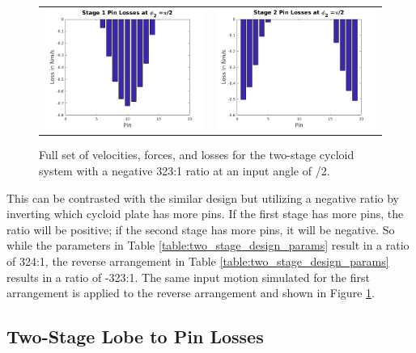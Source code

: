 \begin{figure}[!t]
\begin{tabular}{cc}
	   \hline
	   
	   \includegraphics[width=0.50\columnwidth]{fig/double_1_neg_losses_pi_2} &
	   \includegraphics[width=0.50\columnwidth]{fig/double_2_neg_losses_pi_2}	\\
   \end{tabular}
   \caption{Full set of velocities, forces, and losses for the two-stage cycloid system with a negative 323:1 ratio at an input angle of \textpi/2.}
   \label{fig:two_stage_forces_neg}
\end{figure}

This can be contrasted with the similar design but utilizing a negative ratio by inverting which cycloid plate has more pins. If the first stage has more pins, the ratio will be positive; if the second stage has more pins, it will be negative. So while the parameters in Table \ref{table:two_stage_design_params} result in a ratio of 324:1, the reverse arrangement in Table \ref{table:two_stage_design_params} results in a ratio of -323:1. The same input motion simulated for the first arrangement is applied to the reverse arrangement and shown in Figure \ref{fig:two_stage_forces_neg}.

\subsection{Two-Stage Lobe to Pin Losses} \label{ch:dual:test_results:losses}

